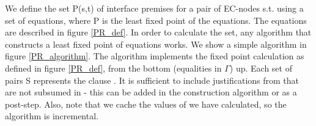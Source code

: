 We define the set P(s,t) of interface premises for a pair of EC-nodes  s.t.  using a set of equations, where P is the least fixed point of the equations. The equations are described in figure \ref{PR_def}. In order to calculate the set, any algorithm that constructs a least fixed point of equations works. We show a simple algorithm in figure \ref{PR_algorithm}. The algorithm implements the fixed point calculation as defined in figure \ref{PR_def}, from the bottom (equalities in $\Gamma$) up. 
Each set of pairs S represents the clause . 
It is sufficient to include justifications from  that are not subsumed in  - this can be added in the construction algorithm or as a post-step. Also, note that we cache the values of  we have calculated, so the algorithm is incremental.


